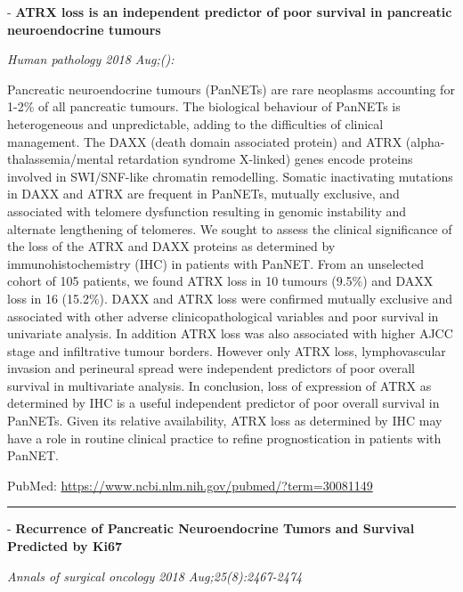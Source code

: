 \documentclass[]{article}
\begin{document}
 - \textbf{ATRX loss is an independent predictor of poor survival in
pancreatic neuroendocrine tumours}

\emph{Human pathology 2018 Aug;():}

Pancreatic neuroendocrine tumours (PanNETs) are rare neoplasms
accounting for 1-2\% of all pancreatic tumours. The biological behaviour
of PanNETs is heterogeneous and unpredictable, adding to the
difficulties of clinical management. The DAXX (death domain associated
protein) and ATRX (alpha-thalassemia/mental retardation syndrome
X-linked) genes encode proteins involved in SWI/SNF-like chromatin
remodelling. Somatic inactivating mutations in DAXX and ATRX are
frequent in PanNETs, mutually exclusive, and associated with telomere
dysfunction resulting in genomic instability and alternate lengthening
of telomeres. We sought to assess the clinical significance of the loss
of the ATRX and DAXX proteins as determined by immunohistochemistry
(IHC) in patients with PanNET. From an unselected cohort of 105
patients, we found ATRX loss in 10 tumours (9.5\%) and DAXX loss in 16
(15.2\%). DAXX and ATRX loss were confirmed mutually exclusive and
associated with other adverse clinicopathological variables and poor
survival in univariate analysis. In addition ATRX loss was also
associated with higher AJCC stage and infiltrative tumour borders.
However only ATRX loss, lymphovascular invasion and perineural spread
were independent predictors of poor overall survival in multivariate
analysis. In conclusion, loss of expression of ATRX as determined by IHC
is a useful independent predictor of poor overall survival in PanNETs.
Given its relative availability, ATRX loss as determined by IHC may have
a role in routine clinical practice to refine prognostication in
patients with PanNET.

PubMed: \url{https://www.ncbi.nlm.nih.gov/pubmed/?term=30081149}

{}

{}

\begin{center}\rule{0.5\linewidth}{\linethickness}\end{center}

 - \textbf{Recurrence of Pancreatic Neuroendocrine Tumors and Survival
Predicted by Ki67}

\emph{Annals of surgical oncology 2018 Aug;25(8):2467-2474}
\end{document}
